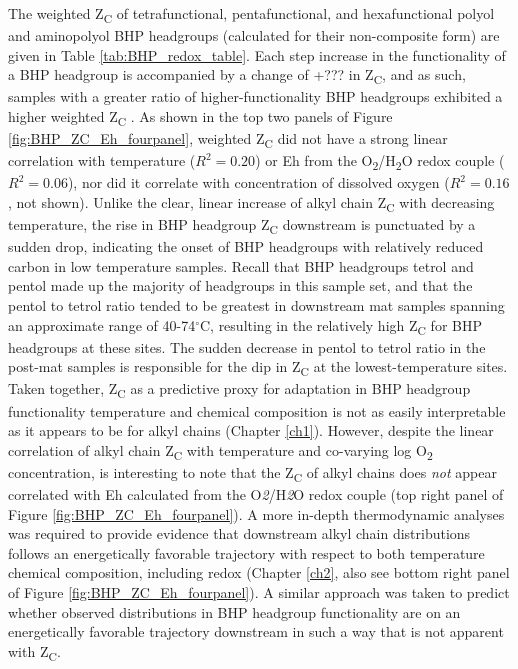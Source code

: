 The weighted Z\textsubscript{C} of tetrafunctional, pentafunctional, and hexafunctional polyol and aminopolyol BHP headgroups (calculated for their non-composite form) are given in Table \ref{tab:BHP_redox_table}. Each step increase in the functionality of a BHP headgroup is accompanied by a change of +??? in Z\textsubscript{C}, and as such, samples with a greater ratio of higher-functionality BHP headgroups exhibited a higher weighted Z\textsubscript{C} . As shown in the top two panels of Figure \ref{fig:BHP_ZC_Eh_fourpanel}, weighted Z\textsubscript{C} did not have a strong linear correlation with temperature ($R^{2} = 0.20$) or Eh from the O\textsubscript{2}/H\textsubscript{2}O redox couple ($R^{2} = 0.06$), nor did it correlate with concentration of dissolved oxygen ($R^{2} = 0.16$, not shown). Unlike the clear, linear increase of alkyl chain Z\textsubscript{C} with decreasing temperature, the rise in BHP headgroup Z\textsubscript{C} downstream is punctuated by a sudden drop, indicating the onset of BHP headgroups with relatively reduced carbon in low temperature samples. Recall that BHP headgroups tetrol and pentol made up the majority of headgroups in this sample set, and that the pentol to tetrol ratio tended to be greatest in downstream mat samples spanning an approximate range of 40-74$^{\circ}$C, resulting in the relatively high Z\textsubscript{C} for BHP headgroups at these sites. The sudden decrease in pentol to tetrol ratio in the post-mat samples is responsible for the dip in Z\textsubscript{C} at the lowest-temperature sites.
Taken together, Z\textsubscript{C} as a predictive proxy for adaptation in BHP headgroup functionality temperature and chemical composition is not as easily interpretable as it appears to be for alkyl chains (Chapter \ref{ch1}). However, despite the linear correlation of alkyl chain Z\textsubscript{C} with temperature and co-varying log O\textsubscript{2} concentration, is interesting to note that the Z\textsubscript{C} of alkyl chains does \textit{not} appear correlated with Eh calculated from the O\textit{2}/H\textit{2}O redox couple (top right panel of Figure \ref{fig:BHP_ZC_Eh_fourpanel}). A more in-depth thermodynamic analyses was required to provide evidence that downstream alkyl chain distributions follows an energetically favorable trajectory with respect to both temperature chemical composition, including redox (Chapter \ref{ch2}, also see bottom right panel of Figure \ref{fig:BHP_ZC_Eh_fourpanel}). A similar approach was taken to predict whether observed distributions in BHP headgroup functionality are on an energetically favorable trajectory downstream in such a way that is not apparent with Z\textsubscript{C}.


